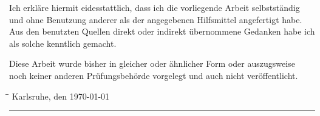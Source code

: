 
Ich erkl\"are hiermit eidesstattlich, dass ich die vorliegende Arbeit selbstst\"andig und ohne Benutzung anderer als der angegebenen Hilfsmittel angefertigt habe. Aus den benutzten Quellen direkt oder indirekt \"ubernommene Gedanken habe ich als solche kenntlich gemacht.

Diese Arbeit wurde bisher in gleicher oder \"ahnlicher Form oder auszugsweise noch keiner anderen Pr\"ufungsbehörde vorgelegt und auch nicht ver\"offentlicht.

\begin{tabbing}
\hspace*{10.5cm}\=\hspace*{6cm}\=\kill
Karlsruhe, den \today \>\rule[-0.2cm]{5cm}{0.5pt}\\
\>\autor\\
\end{tabbing}
